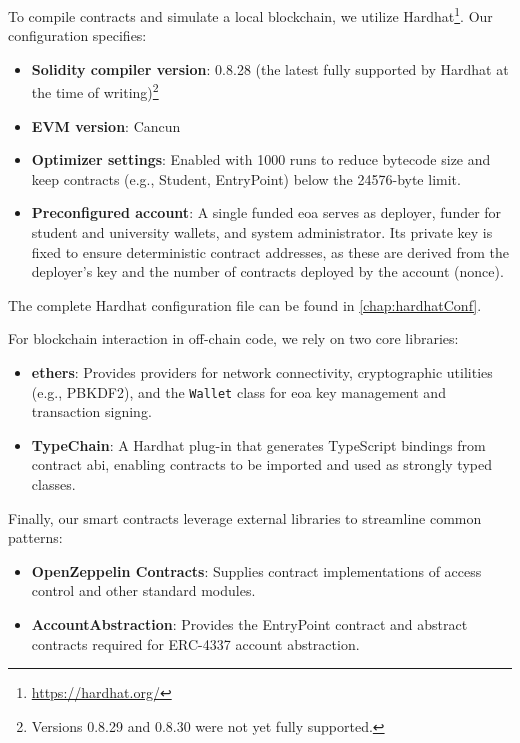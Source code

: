 To compile contracts and simulate a local blockchain, we utilize Hardhat\footnote{\url{https://hardhat.org/}}. Our configuration specifies:
\begin{itemize}
    \item \textbf{Solidity compiler version}: 0.8.28 (the latest fully supported by Hardhat at the time of writing)\footnote{Versions 0.8.29 and 0.8.30 were not yet fully supported.}
    \item \textbf{EVM version}: Cancun
    \item \textbf{Optimizer settings}: Enabled with 1000 runs to reduce bytecode size and keep contracts (e.g., Student, EntryPoint) below the 24576-byte limit.
    \item \textbf{Preconfigured account}: A single funded \acrshort{eoa} serves as deployer, funder for student and university wallets, and system administrator. Its private key is fixed to ensure deterministic contract addresses, as these are derived from the deployer’s key and the number of contracts deployed by the account (\gls{nonce}).
\end{itemize}
The complete Hardhat configuration file can be found in \cref{chap:hardhatConf}.

For blockchain interaction in off-chain code, we rely on two core libraries:
\begin{itemize}
\item \textbf{ethers}: Provides providers for network connectivity, cryptographic utilities (e.g., PBKDF2), and the \texttt{Wallet} class for \acrshort{eoa} key management and transaction signing.
\item \textbf{TypeChain}: A Hardhat plug-in that generates TypeScript bindings from contract \acrfull{abi}, enabling contracts to be imported and used as strongly typed classes.
\end{itemize}

Finally, our smart contracts leverage external libraries to streamline common patterns:
\begin{itemize}
\item \textbf{OpenZeppelin Contracts}: Supplies contract implementations of access control and other standard modules.
\item \textbf{AccountAbstraction}: Provides the EntryPoint contract and abstract contracts required for ERC-4337 account abstraction.
\end{itemize}

